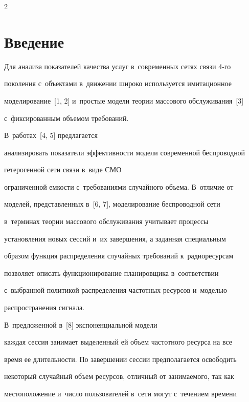 \begin{multicols}{2}



\label{st\stat}

  

\section{Введение}



  Для анализа показателей качества услуг в~современных сетях связи 4-го 

поколения с~объектами в~движении широко используется имитационное 

моделирование~[1, 2] и~простые модели теории массового обслуживания~[3] 

с~фиксированным объемом требований. 



В~работах~[4, 5] предлагается 

анализировать показатели эффективности модели современной беспроводной 

гетерогенной сети связи в~виде СМО

ограниченной емкости с~требованиями случайного объема. В~отличие от 

моделей, представленных в~[6, 7], моделирование беспроводной сети 

в~терминах теории массового обслуживания учитывает процессы 

установления новых сессий и~их завершения, а заданная специальным 

образом функция распределения случайных требований к~радиоресурсам 

позволяет описать функционирование планировщика в~соответствии 

с~выбранной политикой распределения частотных ресурсов и~моделью 

распространения сигнала. 



В~предложенной в~[8] экспоненциальной модели 

каждая сессия занимает выделенный ей объем частотного ресурса на все 

время ее длительности. По завершении сессии предполагается освободить 

некоторый случайный объем ресурсов, отличный от занимаемого, так как 

местоположение и~число пользователей в~сети могут с~течением времени 


\end{multicols}
